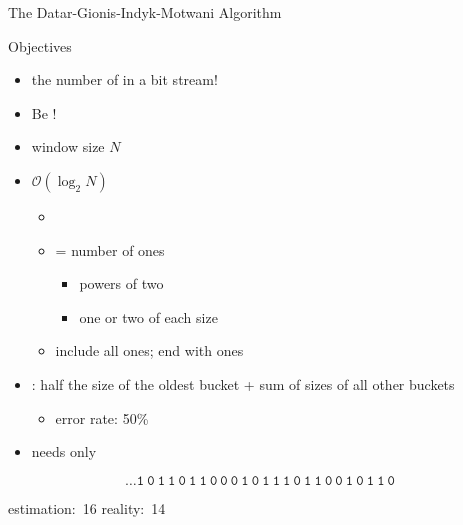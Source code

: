 \begin{frame}{The Datar-Gionis-Indyk-Motwani Algorithm}
	\begin{block}{Objectives}
		\begin{itemize}
			\item
			 the number of  in a bit stream!

			\item
			Be !
		\end{itemize}
	\end{block}
	\begin{itemize}
		\item
		window size $N$

		\item
		$\mathcal{O}(\log_2 N)$ 
		\begin{itemize}
			\item

			\item
			 = number of ones
			\begin{itemize}
				\item
				powers of two

				\item
				one or two of each size
			\end{itemize}

			\item
			include all ones; end with ones
		\end{itemize}
	
		\item
		: half the size of the oldest bucket + sum of sizes of all other buckets
		\begin{itemize}
			\item
			error rate: 50\%
		\end{itemize}
	
		\item
		needs only  
	\end{itemize}
	\vspace{1mm}
	{
		\Large
		\begin{equation*}
			\mathtt{\boxed{\dots 1 ~ 0 ~ 1} ~ \boxed{1 ~ 0 ~ 1 ~ 1 ~ 0 ~ 0 ~ 0 ~ 1} ~ 0 ~ \boxed{1 ~ 1 ~ 1 ~ 0 ~ 1} ~ \boxed{1 ~ 0 ~ 0 ~ 1} ~ 0 ~ \boxed{1} ~ \boxed{1} ~ 0}
		\end{equation*}
	}
	\begin{center}
		\small
		estimation:~16 \qquad\qquad reality:~14
	\end{center}
\end{frame}